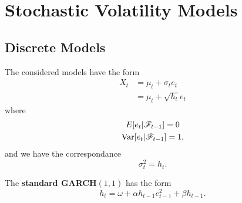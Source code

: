 \documentclass[10pt]{article}
\begin{document}
\section{Stochastic Volatility Models}

\subsection{Discrete Models}
\begin{outline}
  \1 The considered models have the form
  \begin{align*}
    X_t &= \mu_t + \sigma_te_t\\
        &= \mu_t + \sqrt{h_t}e_t
  \end{align*}
  where 
  \begin{gather*}
    E[e_t|\mathscr{F}_{t-1}]=0\\
    \operatorname{Var}[e_t|\mathscr{F}_{t-1}] = 1,
  \end{gather*}
  and we have the correspondance
  \begin{equation*}
    \sigma^2_t = h_t.
  \end{equation*}

  \1 The \textbf{standard GARCH$(1,1)$} has the form
  \begin{equation*}
    h_t = \omega + \alpha h_{t-1}e^2_{t-1} + \beta h_{t-1}.
  \end{equation*}
\end{outline}
\end{document}
